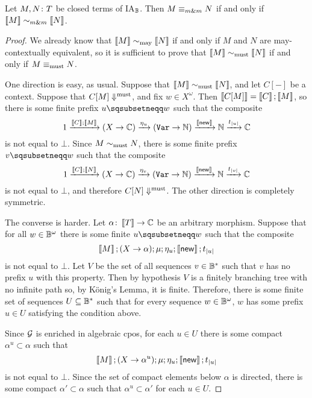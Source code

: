 \documentclass{article}
\begin{document}
\begin{theorem}
  Let $M,N\colon T$ be closed terms of IA${}_{\mathbb{B}}$.
  Then $M\mathrel{\equiv_{m\&m}} N$ if and only if $\left\llbracket M\right\rrbracket\mathrel{\sim_{m\&m}} \left\llbracket N\right\rrbracket$.
  \label{FullAbstractionFiniteNondeterminism}
\end{theorem}
\begin{proof}
  We already know that $\left\llbracket M\right\rrbracket\sim_{\operatorname{may}}\left\llbracket N\right\rrbracket$ if and only if $M$ and $N$ are may-contextually equivalent, so it is sufficient to prove that $\left\llbracket M\right\rrbracket\sim_{\operatorname{must}}\left\llbracket N\right\rrbracket$ if and only if $M\equiv_{\operatorname{must}}N$.

  One direction is easy, as usual.  
  Suppose that $\left\llbracket M\right\rrbracket\sim_{\operatorname{must}} \left\llbracket N\right\rrbracket$, and let $C[-]$ be a context.  
  Suppose that $C[M]\Downarrow^{\text{must}}$, and fix $w\in X^\omega$.
  Then $\left\llbracket C[M]\right\rrbracket = \left\llbracket C\right\rrbracket;\left\llbracket M\right\rrbracket$, so there is some finite prefix $u\pprefix w$ such that the composite
  \[
    1 \xrightarrow{\left\llbracket C\right\rrbracket;\left\llbracket M\right\rrbracket}
    (X \to \mathbb{C}) \xrightarrow{\eta_u}
    ({\mathtt{Var}} \to \mathbb{N}) \xrightarrow{\left\llbracket\operatorname{{\mathsf{new}}}\right\rrbracket}
    \mathbb{N} \xrightarrow{t_{|u|}}
    \mathbb{C}
    \]
  is not equal to $\bot$.  
  Since $M\sim_{\operatorname{must}} N$, there is some finite prefix $v\pprefix w$ such that the composite
  \[
    1 \xrightarrow{\left\llbracket C\right\rrbracket;\left\llbracket N\right\rrbracket}
    (X \to \mathbb{C}) \xrightarrow{\eta_v}
    ({\mathtt{Var}} \to \mathbb{N}) \xrightarrow{\left\llbracket\operatorname{{\mathsf{new}}}\right\rrbracket}
    \mathbb{N} \xrightarrow{t_{|v|}}
    \mathbb{C}
    \]
  is not equal to $\bot$, and therefore $C[N]\Downarrow^{\text{must}}$.  
  The other direction is completely symmetric.

  The converse is harder.  
  Let $\alpha \colon \left\llbracket T\right\rrbracket \to \mathbb{C}$ be an arbitrary morphism.
  Suppose that for all $w\in \mathbb{B}^\omega$ there is some finite $u\pprefix w$ such that the composite
  \[
    \left\llbracket M\right\rrbracket;(X \to \alpha);\mu;\eta_u;\left\llbracket\operatorname{{\mathsf{new}}}\right\rrbracket;t_{|u|}
    \]
  is not equal to $\bot$.  
  Let $V$ be the set of all sequences $v\in \mathbb{B}^*$ such that $v$ has no prefix $u$ with this property.  
  Then by hypothesis $V$ is a finitely branching tree with no infinite path so, by K\"{o}nig's Lemma, it is finite.  
  Therefore, there is some finite set of sequences $U\subseteq \mathbb{B}^*$ such that for every sequence $w\in \mathbb{B}^\omega$, $w$ has some prefix $u\in U$ satisfying the condition above.

  Since $\mathcal G$ is enriched in algebraic cpos, for each $u\in U$ there is some compact $\alpha^u\subset\alpha$ such that
  \[
    \left\llbracket M\right\rrbracket;(X \to \alpha^u);\mu;\eta_u;\left\llbracket\operatorname{{\mathsf{new}}}\right\rrbracket;t_{|u|}
    \]
  is not equal to $\bot$.  
  Since the set of compact elements below $\alpha$ is directed, there is some compact $\alpha'\subset\alpha$ such that $\alpha^u\subset\alpha'$ for each $u\in U$.  


\end{proof}
\end{document}
